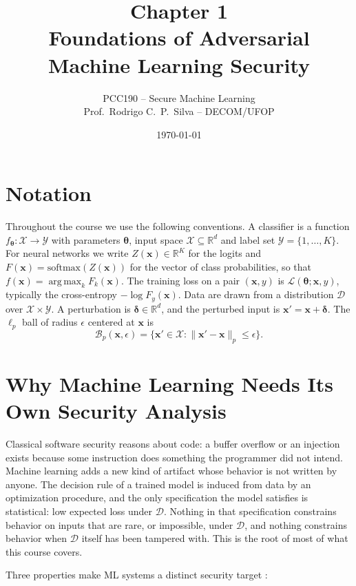 \documentclass[10pt,a4paper]{extarticle}
\title{Chapter 1\\Foundations of Adversarial Machine Learning Security}
\author{PCC190 -- Secure Machine Learning\\Prof.\ Rodrigo C.\ P.\ Silva -- DECOM/UFOP}
\date{\today}
\theoremstyle{definition}
\newcommand{\R}{\mathbb{R}}
\newcommand{\X}{\mathcal{X}}
\newcommand{\Y}{\mathcal{Y}}
\newcommand{\D}{\mathcal{D}}
\newcommand{\Loss}{\mathcal{L}}
\newcommand{\x}{\mathbf{x}}
\newcommand{\xadv}{\mathbf{x}'}
\newcommand{\bdelta}{\boldsymbol{\delta}}
\newcommand{\btheta}{\boldsymbol{\theta}}
\newcommand{\B}{\mathcal{B}}
\DeclareMathOperator*{\argmax}{arg\,max}
\begin{document}
\maketitle
\thispagestyle{fancy}
\tableofcontents

\section*{Notation}

Throughout the course we use the following conventions. A classifier is a function \(f_{\btheta}: \X \to \Y\) with parameters \(\btheta\), input space \(\X \subseteq \R^d\) and label set \(\Y = \{1,\dots,K\}\). For neural networks we write \(Z(\x) \in \R^K\) for the logits and \(F(\x) = \mathrm{softmax}(Z(\x))\) for the vector of class probabilities, so that \(f(\x) = \argmax_k F_k(\x)\). The training loss on a pair \((\x, y)\) is \(\Loss(\btheta; \x, y)\), typically the cross-entropy \(-\log F_y(\x)\). Data are drawn from a distribution \(\D\) over \(\X \times \Y\). A perturbation is \(\bdelta \in \R^d\), and the perturbed input is \(\xadv = \x + \bdelta\). The \(\ell_p\) ball of radius \(\epsilon\) centered at \(\x\) is
\[
\B_p(\x, \epsilon) = \{\xadv \in \X : \|\xadv - \x\|_p \le \epsilon\}.
\]

\section{Why Machine Learning Needs Its Own Security Analysis}

Classical software security reasons about code: a buffer overflow or an injection exists because some instruction does something the programmer did not intend. Machine learning adds a new kind of artifact whose behavior is not written by anyone. The decision rule of a trained model is induced from data by an optimization procedure, and the only specification the model satisfies is statistical: low expected loss under \(\D\). Nothing in that specification constrains behavior on inputs that are rare, or impossible, under \(\D\), and nothing constrains behavior when \(\D\) itself has been tampered with. This is the root of most of what this course covers.

Three properties make ML systems a distinct security target \citep{barreno2006can,huang2011adversarial,papernot2018sok}:
\end{document}
